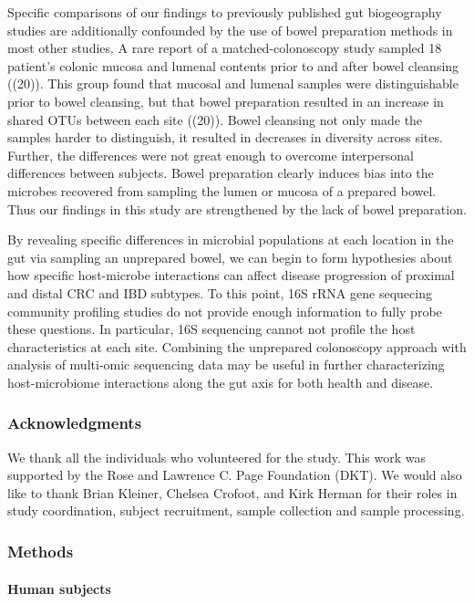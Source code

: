 \documentclass[11pt,]{article}
\let\oldparagraph\paragraph
\renewcommand{\paragraph}[1]{\oldparagraph{#1}\mbox{}}
\begin{document}
Specific comparisons of our findings to previously published gut
biogeography studies are additionally confounded by the use of bowel
preparation methods in most other studies. A rare report of a
matched-colonoscopy study sampled 18 patient's colonic mucosa and
lumenal contents prior to and after bowel cleansing ((20)). This group
found that mucosal and lumenal samples were distinguishable prior to
bowel cleansing, but that bowel preparation resulted in an increase in
shared OTUs between each site ((20)). Bowel cleansing not only made the
samples harder to distinguish, it resulted in decreases in diversity
across sites. Further, the differences were not great enough to overcome
interpersonal differences between subjects. Bowel preparation clearly
induces bias into the microbes recovered from sampling the lumen or
mucosa of a prepared bowel. Thus our findings in this study are
strengthened by the lack of bowel preparation.

By revealing specific differences in microbial populations at each
location in the gut via sampling an unprepared bowel, we can begin to
form hypothesies about how specific host-microbe interactions can affect
disease progression of proximal and distal CRC and IBD subtypes. To this
point, 16S rRNA gene sequecing community profiling studies do not
provide enough information to fully probe these questions. In
particular, 16S sequencing cannot not profile the host characteristics
at each site. Combining the unprepared colonoscopy approach with
analysis of multi-omic sequencing data may be useful in further
characterizing host-microbiome interactions along the gut axis for both
health and disease.

\subsubsection{Acknowledgments}\label{acknowledgments}

We thank all the individuals who volunteered for the study. This work
was supported by the Rose and Lawrence C. Page Foundation (DKT). We
would also like to thank Brian Kleiner, Chelsea Crofoot, and Kirk Herman
for their roles in study coordination, subject recruitment, sample
collection and sample processing.

\subsubsection{Methods}\label{methods}

\paragraph{Human subjects}\label{human-subjects}
\end{document}
